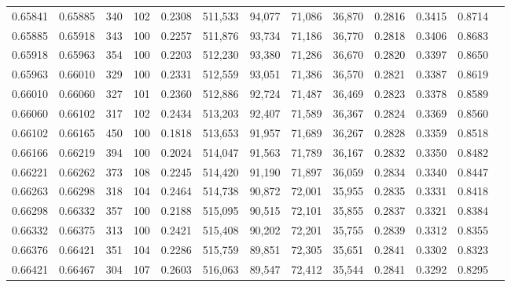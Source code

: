 \begin{tabular}{rrrrrrrrrrrrr}
0.65841 & 0.65885 &   340 & 102 &                                     0.2308 & 511,533 &  94,077 &  71,086 &  36,870 & 0.2816 & 0.3415 & 0.8714 \\
0.65885 & 0.65918 &   343 & 100 &                                     0.2257 & 511,876 &  93,734 &  71,186 &  36,770 & 0.2818 & 0.3406 & 0.8683 \\
0.65918 & 0.65963 &   354 & 100 &                                     0.2203 & 512,230 &  93,380 &  71,286 &  36,670 & 0.2820 & 0.3397 & 0.8650 \\
0.65963 & 0.66010 &   329 & 100 &                                     0.2331 & 512,559 &  93,051 &  71,386 &  36,570 & 0.2821 & 0.3387 & 0.8619 \\
0.66010 & 0.66060 &   327 & 101 &                                     0.2360 & 512,886 &  92,724 &  71,487 &  36,469 & 0.2823 & 0.3378 & 0.8589 \\
0.66060 & 0.66102 &   317 & 102 &                                     0.2434 & 513,203 &  92,407 &  71,589 &  36,367 & 0.2824 & 0.3369 & 0.8560 \\
0.66102 & 0.66165 &   450 & 100 &                                     0.1818 & 513,653 &  91,957 &  71,689 &  36,267 & 0.2828 & 0.3359 & 0.8518 \\
0.66166 & 0.66219 &   394 & 100 &                                     0.2024 & 514,047 &  91,563 &  71,789 &  36,167 & 0.2832 & 0.3350 & 0.8482 \\
0.66221 & 0.66262 &   373 & 108 &                                     0.2245 & 514,420 &  91,190 &  71,897 &  36,059 & 0.2834 & 0.3340 & 0.8447 \\
0.66263 & 0.66298 &   318 & 104 &                                     0.2464 & 514,738 &  90,872 &  72,001 &  35,955 & 0.2835 & 0.3331 & 0.8418 \\
0.66298 & 0.66332 &   357 & 100 &                                     0.2188 & 515,095 &  90,515 &  72,101 &  35,855 & 0.2837 & 0.3321 & 0.8384 \\
0.66332 & 0.66375 &   313 & 100 &                                     0.2421 & 515,408 &  90,202 &  72,201 &  35,755 & 0.2839 & 0.3312 & 0.8355 \\
0.66376 & 0.66421 &   351 & 104 &                                     0.2286 & 515,759 &  89,851 &  72,305 &  35,651 & 0.2841 & 0.3302 & 0.8323 \\
0.66421 & 0.66467 &   304 & 107 &                                     0.2603 & 516,063 &  89,547 &  72,412 &  35,544 & 0.2841 & 0.3292 & 0.8295 \\

\end{tabular}
